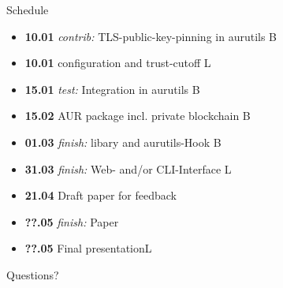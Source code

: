 \documentclass{beamer}
\begin{document}
\begin{frame}{Schedule}
	\begin{itemize}
		\item \textbf{10.01} \emph{contrib:} TLS-public-key-pinning in aurutils \hfill B
		\item \textbf{10.01} configuration and trust-cutoff \hfill L
		\item \textbf{15.01} \emph{test:} \alert{Integration in aurutils} \hfill B
		\item \textbf{15.02} \alert{AUR package} incl. private blockchain \hfill B
		\item \textbf{01.03} \emph{finish:} libary and aurutils-Hook \hfill B
		\item \textbf{31.03} \emph{finish:} Web- and/or CLI-Interface \hfill L
		\item \textbf{21.04} \alert{Draft paper} for feedback\hfill
		\item \textbf{??.05} \emph{finish:} Paper\hfill
		\item \textbf{??.05} Final presentation\hfill L
	\end{itemize}
\end{frame}

\begin{frame}[standout]
	Questions?
\end{frame}
\end{document}
